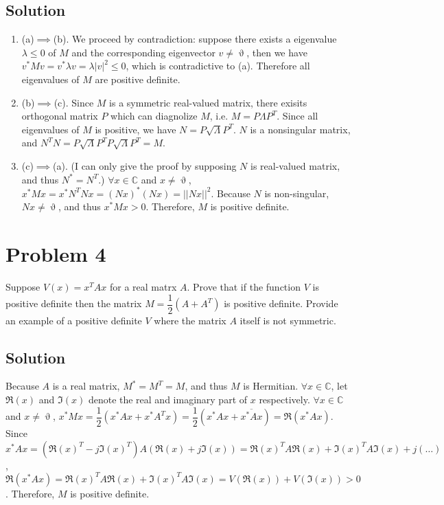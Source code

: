 \documentclass[11pt]{report}
\theoremstyle{definition}
\newcommand{\xlr}[2]{#1 \left(#2\right)}
\begin{document}
\subsection*{Solution}
\begin{enumerate}[.]
\item
(a)$\implies$(b). We proceed by contradiction: suppose there exists a eigenvalue $\lambda \leq 0$ of $M$ and the corresponding eigenvector $v \neq \upvartheta$, then we have $v^* M v = v^* \lambda v = \lambda |v|^2 \leq 0$, which is contradictive to (a). Therefore all eigenvalues of $M$ are positive definite.
\item
(b)$\implies$(c). Since $M$ is a symmetric real-valued matrix, there exisits orthogonal matrix $P$ which can diagnolize $M$, i.e. $M = P \Lambda P^T$. Since all eigenvalues of $M$ is positive, we have $N = P \sqrt{\Lambda} P^T$. $N$ is a nonsingular matrix, and $N^T N = P \sqrt{\Lambda} P^T P \sqrt{\Lambda} P^T = M$.
\item
(c)$\implies$(a). (I can only give the proof by supposing $N$ is real-valued matrix, and thus $N^* = N^T$.) $\forall x \in \mathbb{C}$ and $x \neq \upvartheta$, $x^* M x = x^* N^T N x = (Nx)^*(Nx) = ||Nx||^2$. Because $N$ is non-singular, $Nx \neq \upvartheta$, and thus $x^* M x > 0$. Therefore, $M$ is positive definite.
\end{enumerate}

\section*{Problem 4}
Suppose $\xlr{V}{x} = x^T A x $ for a real matrx $A$. Prove that if the function $V$ is positive definite then the matrix $M = \dfrac{1}{2} \xlr{}{A + A^T} $ is positive definite. Provide an example of a positive definite $V$ where the matrix $A$ itself is not symmetric.

\subsection*{Solution}
Because $A$ is a real matrix, $M^* = M^T = M$, and thus $M$ is Hermitian. $\forall x \in \mathbb{C}$, let $\Re(x)$ and $\Im(x)$ denote the real and imaginary part of $x$ respectively. $\forall x \in \mathbb{C}$ and $x \neq \upvartheta$, $x^* M x = \dfrac{1}{2} (x^* A x + x^* A^T x) = \dfrac{1}{2} (x^* A x + \overline{x^* A x}) = \Re(x^* A x)$. Since $x^* A x = (\Re(x)^T-j\Im(x)^T) A (\Re(x)+j\Im(x)) = \Re(x)^T A \Re(x) + \Im(x)^T A \Im(x) + j(\ldots)$, $\Re(x^* A x) = \Re(x)^T A \Re(x) + \Im(x)^T A \Im(x) = \xlr{V}{\Re(x)} + \xlr{V}{\Im(x)} > 0$. Therefore, $M$ is positive definite.
\end{document}
